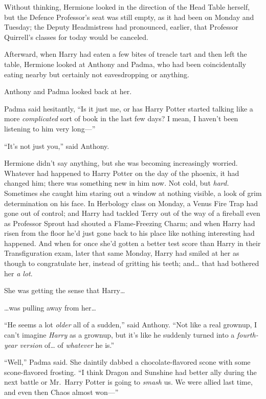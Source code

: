 Without thinking, Hermione looked in the direction of the Head Table
herself, but the Defence Professor's seat was still empty, as it had
been on Monday and Tuesday; the Deputy Headmistress had pronounced,
earlier, that Professor Quirrell's classes for today would be canceled.

Afterward, when Harry had eaten a few bites of treacle tart and then
left the table, Hermione looked at Anthony and Padma, who had been
coincidentally eating nearby but certainly not eavesdropping or
anything.

Anthony and Padma looked back at her.

Padma said hesitantly, ``Is it just me, or has Harry Potter started
talking like a more \emph{complicated} sort of book in the last few
days? I mean, I haven't been listening to him very long---''

``It's not just you,'' said Anthony.

Hermione didn't say anything, but she was becoming increasingly worried.
Whatever had happened to Harry Potter on the day of the phoenix, it had
changed him; there was something new in him now. Not cold, but
\emph{hard.} Sometimes she caught him staring out a window at nothing
visible, a look of grim determination on his face. In Herbology class on
Monday, a Venus Fire Trap had gone out of control; and Harry had tackled
Terry out of the way of a fireball even as Professor Sprout had shouted
a Flame-Freezing Charm; and when Harry had risen from the floor he'd
just gone back to his place like nothing interesting had happened. And
when for once she'd gotten a better test score than Harry in their
Transfiguration exam, later that same Monday, Harry had smiled at her as
though to congratulate her, instead of gritting his teeth; and\ldots{}
that had bothered her \emph{a lot}.

She was getting the sense that Harry\ldots{}

\ldots{}was pulling away from her\ldots{}

``He seems a lot \emph{older} all of a sudden,'' said Anthony. ``Not
like a real grownup, I can't imagine \emph{Harry} as a grownup, but it's
like he suddenly turned into a \emph{fourth-year version} of\ldots{} of
\emph{whatever} he is.''

``Well,'' Padma said. She daintily dabbed a chocolate-flavored scone
with some scone-flavored frosting. ``I think Dragon and Sunshine had
better ally during the next battle or Mr.~Harry Potter is going to
\emph{smash} us. We were allied last time, and even then Chaos almost
won---''

